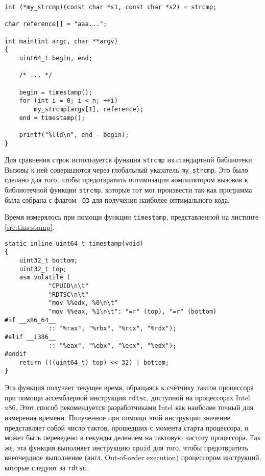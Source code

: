 \nopagebreak

\begin{lstlisting}[caption=Фрагмент программы \texttt{vulnerable.c}, label=src:vulnsnip]
int (*my_strcmp)(const char *s1, const char *s2) = strcmp;

char reference[] = "aaa...";

int main(int argc, char **argv)
{
	uint64_t begin, end;

	/* ... */

	begin = timestamp();
	for (int i = 0; i < n; ++i)
		my_strcmp(argv[1], reference);
	end = timestamp();

	printf("%lld\n", end - begin);
}
\end{lstlisting}

Для сравнения строк используется функция \texttt{strcmp} из стандартной
библиотеки. Вызовы к ней совершаются через глобальный указатель
\texttt{my\_strcmp}. Это было сделано для того, чтобы предотвратить оптимизации
компилятором вызовов к библиотечной функции \texttt{strcmp}, которые тот мог
произвести так как программа была собрана с флагом \texttt{-O3} для получения
наиболее оптимального кода.

Время измерялось при помощи функции \texttt{timestamp}, представленной на листинге
\ref{src:timestamp}.

\nopagebreak

\begin{lstlisting}[caption=Функция \texttt{timestamp}, label=src:timestamp]
static inline uint64_t timestamp(void)
{
	uint32_t bottom;
	uint32_t top;
	asm volatile (
			"CPUID\n\t"
			"RDTSC\n\t"
			"mov %%edx, %0\n\t"
			"mov %%eax, %1\n\t": "=r" (top), "=r" (bottom)
#if __x86_64__
			:: "%rax", "%rbx", "%rcx", "%rdx");
#elif __i386__
			:: "%eax", "%ebx", "%ecx", "%edx");
#endif
	return (((uint64_t) top) << 32) | bottom;
}
\end{lstlisting}

Эта функция получает текущее время, обращаясь к счётчику тактов процессора при
помощи ассемблерной инструкции \texttt{rdtsc}, доступной на процессорах Intel
x86. Этот способ рекомендуется разработчиками Intel \cite{rdtsc} как наиболее
точный для измерения времени. Полученное при помощи этой инструкции значение
представляет собой число тактов, прошедших с момента старта процессора, и
может быть переведено в секунды делением на тактовую частоту процессора. Так же,
эта функция выполняет инструкцию \texttt{cpuid} для того, чтобы предотвратить
внеочердное выполнение (англ. Out-of-order execution) процессором инструкций,
которые следуют за \texttt{rdtsc}.


